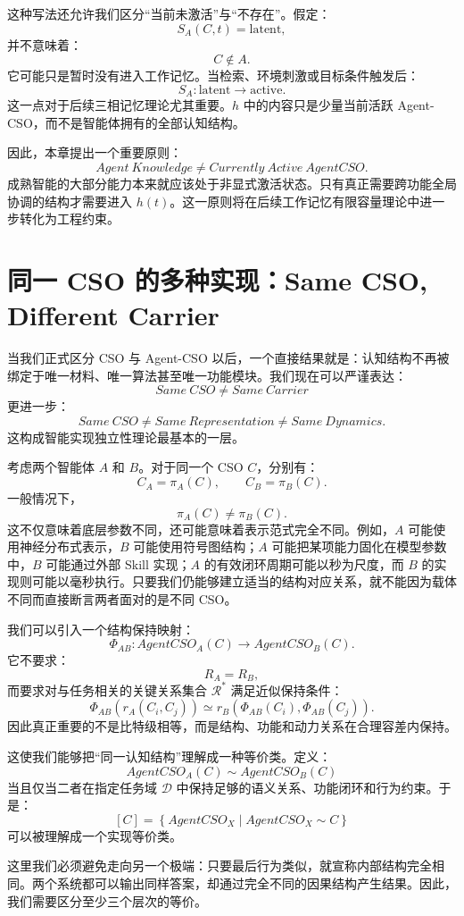 这种写法还允许我们区分“当前未激活”与“不存在”。假定：
\[
S_A(C,t)=\text{latent},
\]
并不意味着：
\[
C\notin A.
\]
它可能只是暂时没有进入工作记忆。当检索、环境刺激或目标条件触发后：
\[
S_A:
\text{latent}
\rightarrow
\text{active}.
\]
这一点对于后续三相记忆理论尤其重要。$h$ 中的内容只是少量当前活跃 Agent-CSO，而不是智能体拥有的全部认知结构。

因此，本章提出一个重要原则：
\[
\boxed{
Agent\ Knowledge
\neq
Currently\ Active\ AgentCSO.
}
\]
成熟智能的大部分能力本来就应该处于非显式激活状态。只有真正需要跨功能全局协调的结构才需要进入 $h(t)$。这一原则将在后续工作记忆有限容量理论中进一步转化为工程约束。

\section{同一 CSO 的多种实现：Same CSO, Different Carrier}

当我们正式区分 CSO 与 Agent-CSO 以后，一个直接结果就是：认知结构不再被绑定于唯一材料、唯一算法甚至唯一功能模块。我们现在可以严谨表达：
\[
\boxed{
Same\ CSO
\neq
Same\ Carrier
}
\]
更进一步：
\[
\boxed{
Same\ CSO
\neq
Same\ Representation
\neq
Same\ Dynamics.
}
\]
这构成智能实现独立性理论最基本的一层。

考虑两个智能体 $A$ 和 $B$。对于同一个 CSO $C$，分别有：
\[
C_A=\pi_A(C),
\qquad
C_B=\pi_B(C).
\]
一般情况下，
\[
\pi_A(C)\neq\pi_B(C).
\]
这不仅意味着底层参数不同，还可能意味着表示范式完全不同。例如，$A$ 可能使用神经分布式表示，$B$ 可能使用符号图结构；$A$ 可能把某项能力固化在模型参数中，$B$ 可能通过外部 Skill 实现；$A$ 的有效闭环周期可能以秒为尺度，而 $B$ 的实现则可能以毫秒执行。只要我们仍能够建立适当的结构对应关系，就不能因为载体不同而直接断言两者面对的是不同 CSO。

我们可以引入一个结构保持映射：
\[
\Phi_{AB}:
AgentCSO_A(C)
\rightarrow
AgentCSO_B(C).
\]
它不要求：
\[
R_A=R_B,
\]
而要求对与任务相关的关键关系集合 $\mathcal R^\ast$ 满足近似保持条件：
\[
\Phi_{AB}
\left(
r_A(C_i,C_j)
\right)
\simeq
r_B
\left(
\Phi_{AB}(C_i),
\Phi_{AB}(C_j)
\right).
\]
因此真正重要的不是比特级相等，而是结构、功能和动力关系在合理容差内保持。

这使我们能够把“同一认知结构”理解成一种等价类。定义：
\[
AgentCSO_A(C)
\sim
AgentCSO_B(C)
\]
当且仅当二者在指定任务域 $\mathcal D$ 中保持足够的语义关系、功能闭环和行为约束。于是：
\[
[C]
=
\left\{
AgentCSO_X
\mid
AgentCSO_X\sim C
\right\}
\]
可以被理解成一个实现等价类。

这里我们必须避免走向另一个极端：只要最后行为类似，就宣称内部结构完全相同。两个系统都可以输出同样答案，却通过完全不同的因果结构产生结果。因此，我们需要区分至少三个层次的等价。

